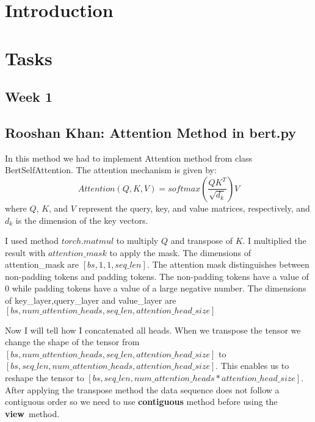 \documentclass{article}
\begin{document}
\section{Introduction}
\section{Tasks}
\subsection{Week 1}
\subsection{Rooshan Khan: Attention Method in bert.py}
In this method we had to implement Attention method from class BertSelfAttention. The attention mechanism is given by:
\begin{equation} \label{eqn}
Attention(Q,K,V) = {softmax(\frac{QK^T}{\sqrt{d_k}})V}
\end{equation}
where \( Q \), \( K \), and \( V \) represent the query, key, and value matrices, respectively, and \( d_k \) is the dimension of the key vectors.

I used method \( torch.matmul \) to multiply \( Q \) and transpose of \( K \). I multiplied the result with \( attention\_mask \) to apply the mask. The dimensions of attention\_mask are \( [bs, 1, 1, seq\_len] \). The attention mask distinguishes between non-padding tokens and padding tokens. The non-padding tokens have a value of 0 while padding tokens have a value of a large negative number. The dimensions of key\_layer,query\_layer and value\_layer are \( [bs, num\_attention\_heads, seq\_len, attention\_head\_size] \)

Now I will tell how I concatenated all heads. When we transpose the tensor we change the shape of the tensor from \( [bs,num\_attention\_heads,seq\_len,attention\_head\_size] \) to \( [bs,seq\_len,num\_attention\_heads,attention\_head\_size] \). This enables us to reshape the tensor to \( [bs,seq\_len,num\_attention\_heads*attention\_head\_size] \). After applying the transpose method the data sequence does not follow a contiguous order so we need to use \textbf{contiguous} method before using the \textbf{view}\ method.
\end{document}
